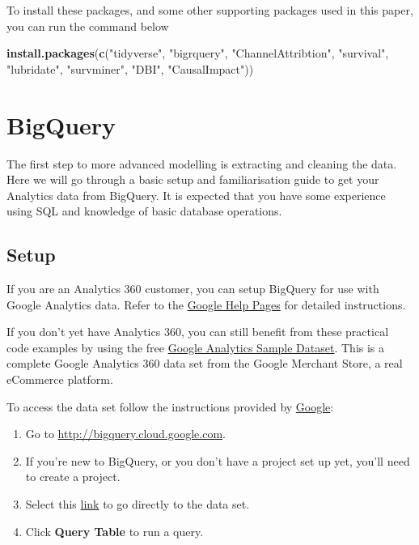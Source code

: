 \documentclass[]{book}
\newenvironment{Shaded}{\begin{snugshade}}{\end{snugshade}}
\newcommand{\KeywordTok}[1]{\textcolor[rgb]{0.13,0.29,0.53}{\textbf{#1}}}
\newcommand{\NormalTok}[1]{#1}
\newcommand{\StringTok}[1]{\textcolor[rgb]{0.31,0.60,0.02}{#1}}
\begin{document}
To install these packages, and some other supporting packages used in this
paper, you can run the command below

\begin{Shaded}
\begin{Highlighting}[]
\KeywordTok{install.packages}\NormalTok{(}\KeywordTok{c}\NormalTok{(}\StringTok{"tidyverse"}\NormalTok{, }\StringTok{"bigrquery"}\NormalTok{, }\StringTok{"ChannelAttribtion"}\NormalTok{, }\StringTok{"survival"}\NormalTok{,}
                   \StringTok{"lubridate"}\NormalTok{, }\StringTok{"survminer"}\NormalTok{, }\StringTok{"DBI"}\NormalTok{, }\StringTok{"CausalImpact"}\NormalTok{))}
\end{Highlighting}
\end{Shaded}

\hypertarget{bigquery-1}{%
\section{BigQuery}\label{bigquery-1}}

The first step to more advanced modelling is extracting and cleaning the data. Here
we will go through a basic setup and familiarisation guide to get your
Analytics data from BigQuery. It is expected that you have some experience
using SQL and knowledge of basic database operations.

\hypertarget{setup-1}{%
\subsection{Setup}\label{setup-1}}

If you are an Analytics 360 customer, you can setup BigQuery for use with
Google Analytics data. Refer to the
\href{https://support.google.com/analytics/answer/3416092?hl=en\&ref_topic=3416089}{Google Help Pages}
for detailed instructions.

If you don't yet have Analytics 360, you can still benefit from these practical
code examples by using the free \href{https://support.google.com/analytics/answer/7586738?hl=en\&ref_topic=3416089}{Google Analytics Sample Dataset}.
This is a complete Google Analytics 360 data set from the Google Merchant Store,
a real eCommerce platform.

To access the data set follow the instructions provided by \href{https://support.google.com/analytics/answer/7586738?hl=en\&ref_topic=3416089}{Google}:

\begin{enumerate}
\def\labelenumi{\arabic{enumi}.}
\item
  Go to \url{http://bigquery.cloud.google.com}.
\item
  If you're new to BigQuery, or you don't have a project set up yet, you'll need to create a project.
\item
  Select this \href{https://bigquery.cloud.google.com/table/bigquery-public-data:google_analytics_sample.ga_sessions_20170801?pli=1}{link} to go directly to the data set.
\item
  Click \textbf{Query Table} to run a query.
\end{enumerate}
\end{document}
